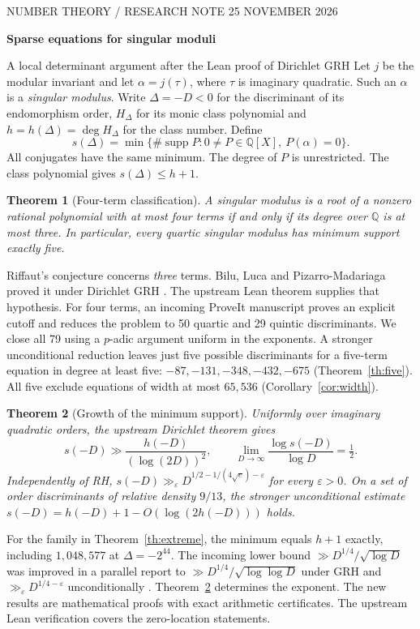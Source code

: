 \documentclass[11pt,letterpaper]{article}
\newtheorem{theorem}{Theorem}\newtheorem{lemma}[theorem]{Lemma}
\newcommand{\Q}{\mathbb Q}\newcommand{\Z}{\mathbb Z}\newcommand{\F}{\mathbb F}
\newcommand{\supp}{\operatorname{supp}}\newcommand{\ord}{\operatorname{ord}}
\begin{document}
\thispagestyle{plain}
{\small\sffamily\color{blue} NUMBER THEORY \quad / \quad RESEARCH NOTE \hfill 25 NOVEMBER 2026}\par
\vspace{.35cm}
{\LARGE\bfseries\color{ink} Sparse equations for singular moduli}\par
{\large A local determinant argument after the Lean proof of Dirichlet GRH}
\divider
Let $j$ be the modular invariant and let $\alpha=j(\tau)$, where $\tau$ is imaginary quadratic. Such an $\alpha$ is a \emph{singular modulus}. Write $\Delta=-D<0$ for the discriminant of its endomorphism order, $H_\Delta$ for its monic class polynomial and $h=h(\Delta)=\deg H_\Delta$ for the class number. Define
\[
 s(\Delta)=\min\{\#\supp P : 0\ne P\in\Q[X],\ P(\alpha)=0\}.
\]
All conjugates have the same minimum. The degree of $P$ is unrestricted. The class polynomial gives $s(\Delta)\le h+1$.

\begin{theorem}[Four-term classification]\label{th:four}
A singular modulus is a root of a nonzero rational polynomial with at most four terms if and only if its degree over $\Q$ is at most three. In particular, every quartic singular modulus has minimum support exactly five.
\end{theorem}
Riffaut's conjecture concerns \emph{three} terms. Bilu, Luca and Pizarro-Madariaga proved it under Dirichlet GRH \cite{riffaut}. The upstream Lean theorem supplies that hypothesis. For four terms, an incoming ProveIt manuscript \cite{prior} proves an explicit cutoff and reduces the problem to 50 quartic and 29 quintic discriminants. We close all 79 using a $p$-adic argument uniform in the exponents. A stronger unconditional reduction leaves just five possible discriminants for a five-term equation in degree at least five: $-87,-131,-348,-432,-675$ (Theorem~\ref{th:five}). All five exclude equations of width at most $65{,}536$ (Corollary~\ref{cor:width}).

\begin{theorem}[Growth of the minimum support]\label{th:growth}
Uniformly over imaginary quadratic orders, the upstream Dirichlet theorem gives
\[
 s(-D)\gg \frac{h(-D)}{(\log(2D))^2},
 \qquad \lim_{D\to\infty}\frac{\log s(-D)}{\log D}=\tfrac12 .
\]
Independently of RH, $s(-D)\gg_\varepsilon D^{1/2-1/(4\sqrt e)-\varepsilon}$ for every $\varepsilon>0$. On a set of order discriminants of relative density $9/13$, the stronger unconditional estimate $s(-D)=h(-D)+1-O(\log(2h(-D)))$ holds.
\end{theorem}
For the family in Theorem~\ref{th:extreme}, the minimum equals $h+1$ exactly, including $1{,}048{,}577$ at $\Delta=-2^{44}$. The incoming lower bound $\gg D^{1/4}/\sqrt{\log D}$ \cite{prior} was improved in a parallel report to $\gg D^{1/4}/\sqrt{\log\log D}$ under GRH and $\gg_\varepsilon D^{1/4-\varepsilon}$ unconditionally \cite{parallel}. Theorem~\ref{th:growth} determines the exponent. The new results are mathematical proofs with exact arithmetic certificates. The upstream Lean verification covers the zero-location statements.
\clearpage
\end{document}
